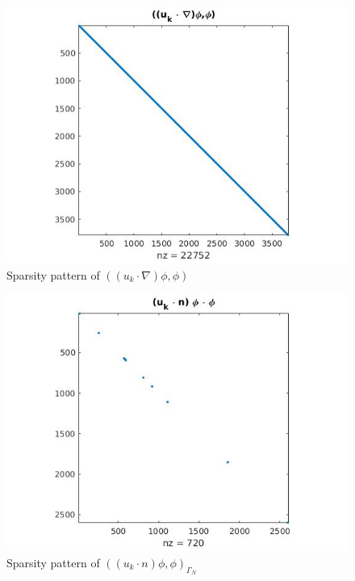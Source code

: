 \documentclass[a4paper,12pt]{book}
\begin{document}
\begin{figure}[H]
\centering
  \includegraphics[width=\linewidth]{figure6.jpg}
  \caption{Sparsity pattern of $((u_k \cdot \nabla)\phi,\phi)$}
  \label{figure_6}
\end{figure}

\begin{figure}[H]
\centering
  \includegraphics[width=\linewidth]{figure7.jpg}
  \caption{Sparsity pattern of $((u_k \cdot n)\phi,\phi)_{\Gamma_N}$}
  \label{figure_7}
\end{figure}
\end{document}
